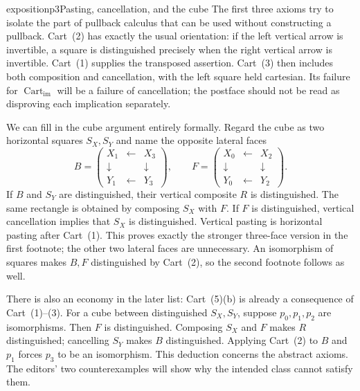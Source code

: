\begin{dcomment}{exposition}{p3}{Pasting, cancellation, and the cube}
The first three axioms try to isolate the part of pullback calculus that can be used without constructing a pullback. Cart~(2) has exactly the usual orientation: if the left vertical arrow is invertible, a square is distinguished precisely when the right vertical arrow is invertible. Cart~(1) supplies the transposed assertion. Cart~(3) then includes both composition and cancellation, with the left square held cartesian. Its failure for $\operatorname{Cart}_{\mathrm{im}}$ will be a failure of cancellation; the postface should not be read as disproving each implication separately.

We can fill in the cube argument entirely formally. Regard the cube as two horizontal squares $S_X,S_Y$ and name the opposite lateral faces
\[
 B=\left(\begin{matrix}X_1&\leftarrow&X_3\\\downarrow&&\downarrow\\Y_1&\leftarrow&Y_3\end{matrix}\right),
 \qquad
 F=\left(\begin{matrix}X_0&\leftarrow&X_2\\\downarrow&&\downarrow\\Y_0&\leftarrow&Y_2\end{matrix}\right).
\]
If $B$ and $S_Y$ are distinguished, their vertical composite $R$ is distinguished. The same rectangle is obtained by composing $S_X$ with $F$. If $F$ is distinguished, vertical cancellation implies that $S_X$ is distinguished. Vertical pasting is horizontal pasting after Cart~(1). This proves exactly the stronger three-face version in the first footnote; the other two lateral faces are unnecessary. An isomorphism of squares makes $B,F$ distinguished by Cart~(2), so the second footnote follows as well.

There is also an economy in the later list: Cart~(5)(b) is already a consequence of Cart~(1)--(3). For a cube between distinguished $S_X,S_Y$, suppose $p_0,p_1,p_2$ are isomorphisms. Then $F$ is distinguished. Composing $S_X$ and $F$ makes $R$ distinguished; cancelling $S_Y$ makes $B$ distinguished. Applying Cart~(2) to $B$ and $p_1$ forces $p_3$ to be an isomorphism. This deduction concerns the abstract axioms. The editors' two counterexamples will show why the intended class cannot satisfy them.
\end{dcomment}


